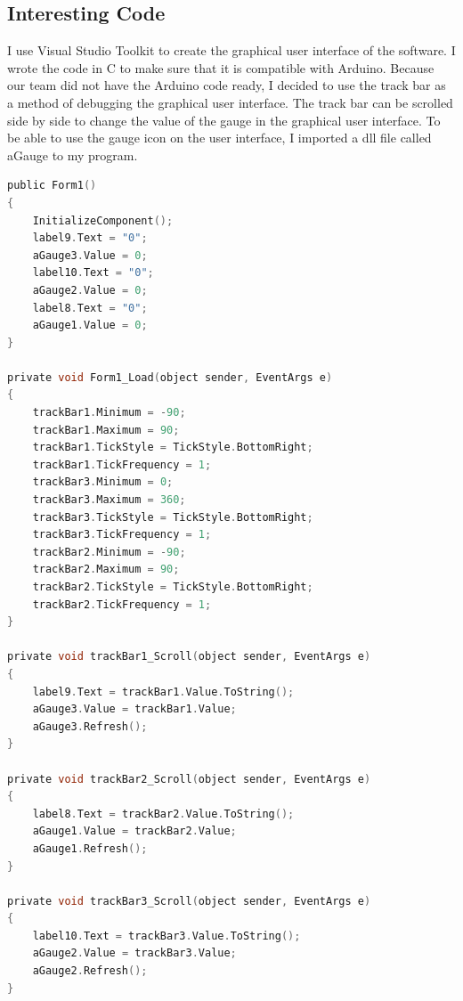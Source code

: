 \subsection{Interesting Code}
I use Visual Studio Toolkit to create the graphical user interface of the software. I wrote the code in C to make sure that it is compatible with Arduino. Because our team did not have the Arduino code ready, I decided to use the track bar as a method of debugging the graphical user interface. The track bar can be scrolled side by side to change the value of the gauge in the graphical user interface. To be able to use the gauge icon on the user interface, I imported a dll file called aGauge to my program. 

\begin{lstlisting}[language=c]
public Form1()
{
    InitializeComponent();
    label9.Text = "0";
    aGauge3.Value = 0;
    label10.Text = "0";
    aGauge2.Value = 0;
    label8.Text = "0";
    aGauge1.Value = 0;
}

private void Form1_Load(object sender, EventArgs e)
{
    trackBar1.Minimum = -90;
    trackBar1.Maximum = 90;
    trackBar1.TickStyle = TickStyle.BottomRight;
    trackBar1.TickFrequency = 1;
    trackBar3.Minimum = 0;
    trackBar3.Maximum = 360;
    trackBar3.TickStyle = TickStyle.BottomRight;
    trackBar3.TickFrequency = 1;
    trackBar2.Minimum = -90;
    trackBar2.Maximum = 90;
    trackBar2.TickStyle = TickStyle.BottomRight;
    trackBar2.TickFrequency = 1;
}

private void trackBar1_Scroll(object sender, EventArgs e)
{
    label9.Text = trackBar1.Value.ToString();
    aGauge3.Value = trackBar1.Value;
    aGauge3.Refresh();
}

private void trackBar2_Scroll(object sender, EventArgs e)
{
    label8.Text = trackBar2.Value.ToString();
    aGauge1.Value = trackBar2.Value;
    aGauge1.Refresh();
}

private void trackBar3_Scroll(object sender, EventArgs e)
{
    label10.Text = trackBar3.Value.ToString();
    aGauge2.Value = trackBar3.Value;
    aGauge2.Refresh();
}
\end{lstlisting}

